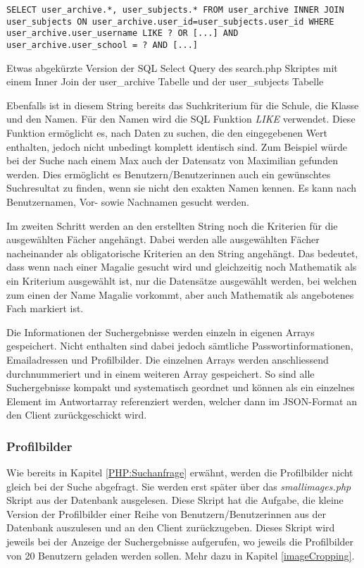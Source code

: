 \documentclass[../main.tex]{subfiles}
\begin{document}
	 \begin{code}
	 	\begin{center}
	 		\begin{verbatim}
SELECT user_archive.*, user_subjects.* FROM user_archive INNER JOIN user_subjects ON user_archive.user_id=user_subjects.user_id WHERE user_archive.user_username LIKE ? OR [...] AND user_archive.user_school = ? AND [...]
	 		\end{verbatim}
	 		\caption{Etwas abgekürzte Version der SQL Select Query des search.php Skriptes mit einem Inner Join der user\_archive Tabelle und der user\_subjects Tabelle}\label{SQL:INNERJOIN}
		\end{center}
	\end{code}	
	 
	 Ebenfalls ist in diesem String bereits das  Suchkriterium für die Schule, die Klasse und den Namen. Für den Namen wird die SQL Funktion \emph{LIKE} verwendet. Diese Funktion ermöglicht es, nach Daten zu suchen, die den eingegebenen Wert enthalten, jedoch nicht unbedingt komplett identisch sind. Zum Beispiel würde bei der Suche nach einem \glqq Max\grqq{} auch der Datensatz von \glqq Maximilian\grqq{} gefunden werden. Dies ermöglicht es Benutzern/Benutzerinnen auch ein gewünschtes Suchresultat zu finden, wenn sie nicht den exakten Namen kennen. Es kann nach Benutzernamen, Vor- sowie Nachnamen gesucht werden.
	 
	 Im zweiten Schritt werden an den erstellten String noch die Kriterien für die ausgewählten Fächer angehängt. Dabei werden alle ausgewählten Fächer nacheinander als obligatorische Kriterien an den String angehängt. Das bedeutet, dass wenn nach einer \glqq Magalie\grqq{} gesucht wird und gleichzeitig noch Mathematik als ein Kriterium ausgewählt ist, nur die Datensätze ausgewählt werden, bei welchen zum einen der Name \glqq Magalie\grqq{} vorkommt, aber auch Mathematik als angebotenes Fach markiert ist.
	 
	 Die Informationen der Suchergebnisse werden einzeln in eigenen Arrays gespeichert. Nicht enthalten sind dabei jedoch sämtliche Passwortinformationen, Emailadressen und Profilbilder. Die einzelnen Arrays werden anschliessend durchnummeriert und in einem weiteren Array gespeichert. So sind alle Suchergebnisse kompakt und systematisch geordnet und können als ein einzelnes Element im Antwortarray referenziert werden, welcher dann im JSON-Format an den Client zurückgeschickt wird.
	 
	 \subsubsection{Profilbilder}
	 Wie bereits in Kapitel \ref{PHP:Suchanfrage} erwähnt, werden die Profilbilder nicht gleich bei der Suche abgefragt. Sie werden erst später über das \emph{smallimages.php} Skript aus der Datenbank ausgelesen. Diese Skript hat die Aufgabe, die kleine Version der Profilbilder einer Reihe von Benutzern/Benutzerinnen aus der Datenbank auszulesen und an den Client zurückzugeben. Dieses Skript wird jeweils bei der Anzeige der Suchergebnisse aufgerufen, wo jeweils die Profilbilder von 20 Benutzern geladen werden sollen. Mehr dazu in Kapitel \ref{imageCropping}.
	 
\end{document}
